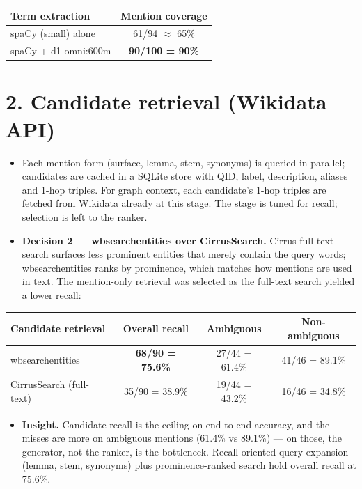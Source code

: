 \documentclass[10pt,a4paper]{article}
\begin{document}
\begin{center}\small
\begin{tabular}{@{}lc@{}}
\toprule
Term extraction & Mention coverage \\
\midrule
spaCy (small) alone & 61/94 $\approx$ 65\% \\
spaCy + d1-omni:600m & \textbf{90/100 = 90\%} \\
\bottomrule
\end{tabular}
\end{center}

\section*{2. Candidate retrieval (Wikidata API)}
\begin{itemize}
  \item Each mention form (surface, lemma, stem, synonyms) is queried in parallel; candidates are cached in a SQLite store with QID, label, description, aliases and 1-hop triples. For graph context, each candidate's 1-hop triples are fetched from Wikidata already at this stage. The stage is tuned for recall; selection is left to the ranker.
  \item \textbf{Decision 2 --- wbsearchentities over CirrusSearch.} Cirrus full-text search surfaces less prominent entities that merely contain the query words; wbsearchentities ranks by prominence, which matches how mentions are used in text. The mention-only retrieval was selected as the full-text search yielded a lower recall:
\end{itemize}

\begin{center}\small
\begin{tabular}{@{}lccc@{}}
\toprule
Candidate retrieval & Overall recall & Ambiguous & Non-ambiguous \\
\midrule
wbsearchentities & \textbf{68/90 = 75.6\%} & 27/44 = 61.4\% & 41/46 = 89.1\% \\
CirrusSearch (full-text) & 35/90 = 38.9\% & 19/44 = 43.2\% & 16/46 = 34.8\% \\
\bottomrule
\end{tabular}
\end{center}

\begin{itemize}
  \item \textbf{Insight.} Candidate recall is the ceiling on end-to-end accuracy, and the misses are more on ambiguous mentions (61.4\% vs 89.1\%) --- on those, the generator, not the ranker, is the bottleneck. Recall-oriented query expansion (lemma, stem, synonyms) plus prominence-ranked search hold overall recall at 75.6\%.
\end{itemize}
\end{document}

